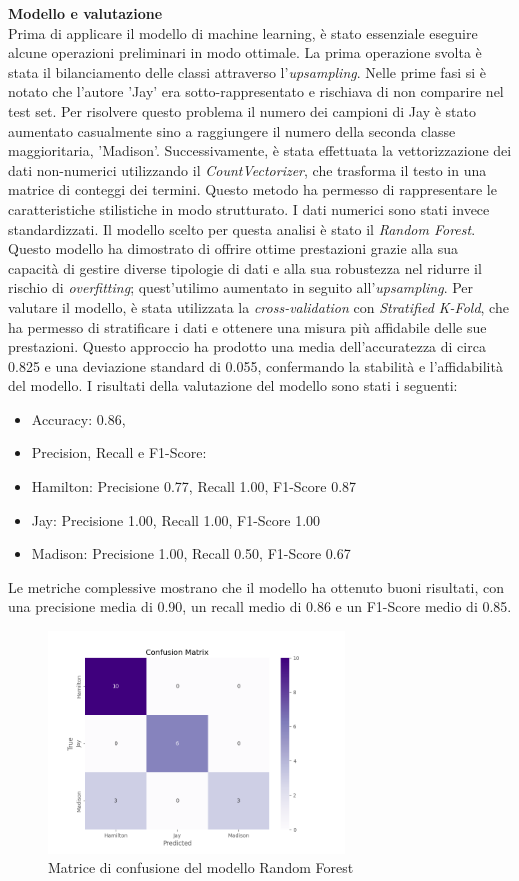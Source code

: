 \documentclass[a4paper, 12pt]{article}
\begin{document}
\textbf{Modello e valutazione}\\
Prima di applicare il modello di machine learning, è stato essenziale eseguire alcune operazioni preliminari in modo ottimale. 
La prima operazione svolta è stata il bilanciamento delle classi attraverso l'\textit{upsampling}. Nelle prime fasi si è notato che l'autore 'Jay' era sotto-rappresentato e rischiava di non comparire nel test set. Per risolvere questo problema il numero dei campioni di Jay è stato aumentato casualmente sino a raggiungere il numero della seconda classe maggioritaria, 'Madison'. 
Successivamente, è stata effettuata la vettorizzazione dei dati non-numerici utilizzando il \textit{CountVectorizer}, che trasforma il testo in una matrice di conteggi dei termini. Questo metodo ha permesso di rappresentare le caratteristiche stilistiche in modo strutturato. I dati numerici sono stati invece standardizzati.
Il modello scelto per questa analisi è stato il \textit{Random Forest}. Questo modello ha dimostrato di offrire ottime prestazioni grazie alla sua capacità di gestire diverse tipologie di dati  e alla sua robustezza nel ridurre il rischio di \textit{overfitting}; quest'utilimo aumentato in seguito all'\textit{upsampling}. 
Per valutare il modello, è stata utilizzata la \textit{cross-validation} con \textit{Stratified K-Fold}, che ha permesso di stratificare i dati e ottenere una misura più affidabile delle sue prestazioni. Questo approccio ha prodotto una media dell'accuratezza di circa 0.825 e una deviazione standard di 0.055, confermando la stabilità e l'affidabilità del modello.
I risultati della valutazione del modello sono stati i seguenti:
\begin{itemize}
	\item Accuracy: 0.86,
	\item  Precision, Recall e F1-Score:
			\item Hamilton: Precisione 0.77, Recall 1.00, F1-Score 0.87
			\item Jay: Precisione 1.00, Recall 1.00, F1-Score 1.00
			\item Madison: Precisione 1.00, Recall 0.50, F1-Score 0.67
\end{itemize}
Le metriche complessive mostrano che il modello ha ottenuto buoni risultati, con una precisione media di 0.90, un recall medio di 0.86 e un F1-Score medio di 0.85.\\
\begin{figure}[h!]
	\centering
	\includegraphics[width=0.7\textwidth]{"confusion_matrix.png"}
	\caption{Matrice di confusione del modello Random Forest}
	\label{fig:conf_matrix}
\end{figure}
\end{document}
